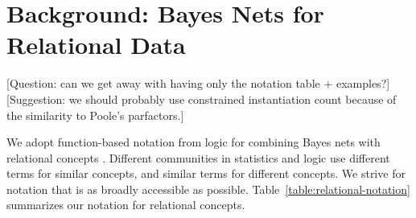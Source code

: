 \documentclass[runningheads,a4paper]{llncs}
\begin{document}
\section{Background: Bayes Nets for Relational Data} \label{sec:background} [Question: can we get away with having only the notation table + examples?] [Suggestion: we should probably use constrained instantiation count because of the similarity to Poole's parfactors.]

We adopt function-based notation from logic for combining Bayes nets with relational concepts \cite{Russell2010,Poole2003,Getoor2006,Chiang2012}. Different communities in statistics and logic use different terms for similar concepts, and similar terms for different concepts. We strive for notation that is as broadly accessible as possible. Table~\ref{table:relational-notation} summarizes our notation for relational concepts. %
\end{document}
